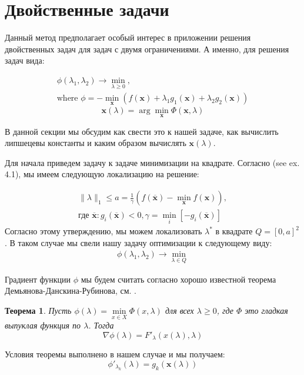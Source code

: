 \documentclass[12pt]{article}
\newtheorem{theorem}{Теорема}[section]
\begin{document}
\section{Двойственные задачи}
\label{details}

Данный метод предполагает особый интерес в приложении решения двойственных задач для задач с двумя ограничениями. А именно, для решения задач вида:

\begin{gather}
\phi(\lambda_1, \lambda_2) \rightarrow \min_{\lambda\geq 0},\\
\text{where } \phi = -\min_\textbf{x}\left(f(\textbf{x}) + \lambda_1 g_1(\textbf{x}) + \lambda_2 g_2(\textbf{x})\right)
\end{gather}
$$\textbf{x}(\lambda) = \arg\min_\textbf{x}\Phi(\textbf{x}, \lambda)$$


В данной секции мы обсудим как свести это к нашей задаче, как вычислить липшецевы константы и каким образом вычислять $\textbf{x}(\lambda)$.

Для начала приведем задачу к задаче минимизации на квадрате. Согласно \cite{task} (see ex. 4.1), мы имеем следующую локализацию на решение:

\begin{gather}
\label{restr:dual}
\|{\lambda}\|_1 \leq a = \frac{1}{\gamma}\left(f(\overline{\textbf{x}}) -\min\limits_{\textbf{x}}f(\textbf{x})\right),\\
\text{где $\overline{\textbf{x}}:g_i(\overline{\textbf{x}})<0,\gamma = \min\limits_i[-g_i(\overline{\textbf{x}})]$}
\end{gather}
Согласно этому утверждению, мы можем локализовать $\lambda^*$ в квадрате $Q = [0, a]^2$. В таком случае мы свели нашу задачу оптимизации к следующему виду:
\begin{gather}
\label{dual}
\phi(\lambda_1, \lambda_2) \rightarrow \min_{\lambda \in Q}
\end{gather}

Градиент функции $\phi$ мы будем считать согласно хорошо известной теорема Демьянова-Данскина-Рубинова, см. \cite{DDR-theorem}.

\begin{theorem}
Пусть $\phi(\lambda)=\min\limits_{x\in X}\Phi(x,\lambda)$ для всех $\lambda\geq0$, где $\Phi$ это гладкая выпуклая функция по $\lambda$. Тогда
$$\nabla \phi(\lambda) = F'_\lambda\left(x(\lambda),\lambda\right)$$
\end{theorem}

Условия теоремы выполнено в нашем случае и мы получаем:
\begin{equation}
\phi'_{\lambda_k}(\lambda) = g_k\left(\textbf{x}(\lambda)\right)
\end{equation}
\end{document}
